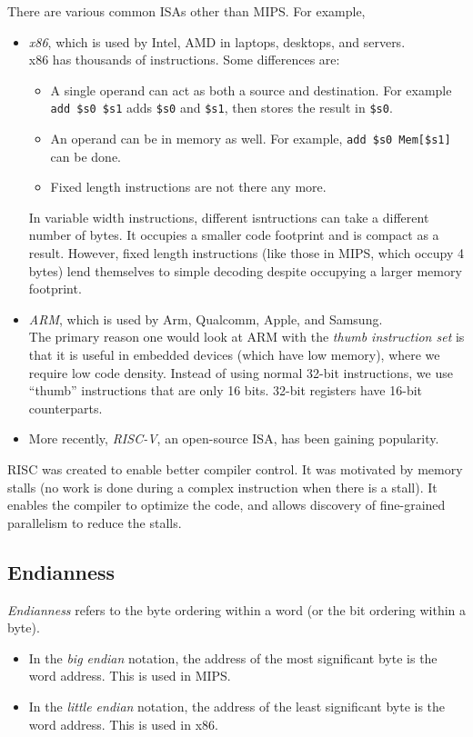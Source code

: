 \documentclass{article}
\begin{document}
			There are various common ISAs other than MIPS. For example,
			\begin{itemize}
				\item \emph{x86}, which is used by Intel, AMD in laptops, desktops, and servers.\\
				x86 has thousands of instructions. Some differences are:
				\begin{itemize}
					\item A single operand can act as both a source and destination. For example \texttt{add \$s0 \$s1} adds \texttt{\$s0} and \texttt{\$s1}, then stores the result in \texttt{\$s0}.
					\item An operand can be in memory as well. For example, \texttt{add \$s0 Mem[\$s1]} can be done.
					\item Fixed length instructions are not there any more.
				\end{itemize}
				In variable width instructions, different isntructions can take a different number of bytes. It occupies a smaller code footprint and is compact as a result. However, fixed length instructions (like those in MIPS, which occupy 4 bytes) lend themselves to simple decoding despite occupying a larger memory footprint.

				\item \emph{ARM}, which is used by Arm, Qualcomm, Apple, and Samsung.\\
				The primary reason one would look at ARM with the \emph{thumb instruction set} is that it is useful in embedded devices (which have low memory), where we require low code density. Instead of using normal 32-bit instructions, we use ``thumb'' instructions that are only 16 bits. 32-bit registers have 16-bit counterparts.
				\item More recently, \emph{RISC-V}, an open-source ISA, has been gaining popularity.
			\end{itemize}

			RISC was created to enable better compiler control. It was motivated by memory stalls (no work is done during a complex instruction when there is a stall). It enables the compiler to optimize the code, and allows discovery of fine-grained parallelism to reduce the stalls.

		\subsection{Endianness}

			\emph{Endianness} refers to the byte ordering within a word (or the bit ordering within a byte).
			\begin{itemize}
				\item In the \emph{big endian} notation, the address of the most significant byte is the word address. This is used in MIPS.
				\item In the \emph{little endian} notation, the address of the least significant byte is the word address. This is used in x86.
			\end{itemize}
\end{document}
